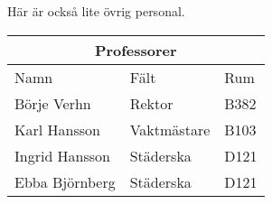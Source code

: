 Här är också lite övrig personal.

\begin{center}
	\begin{tabular}{ |p{3cm}|p{3cm}|p{3cm}|  }
		\hline
		\multicolumn{3}{|c|}{Professorer} \\
		\hline
		Namn & Fält & Rum \\ 
		\hline
		Börje Verhn & Rektor & B382 \\
		Karl Hansson & Vaktmästare & B103 \\
		Ingrid Hansson & Städerska & D121 \\
		Ebba Björnberg & Städerska & D121 \\
		\hline
	\end{tabular}
\end{center}
